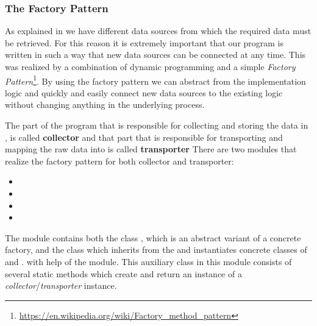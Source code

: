 \subsubsection{The Factory Pattern}
\label{subsubsec:factory}
As explained in  we have different data sources from which the required data must be retrieved.
For this reason it is extremely important that our program is written in such a way that new data sources can be connected at any time.
This was realized by a combination of dynamic programming and a simple \textit{Factory Pattern}\footnote{\url{https://en.wikipedia.org/wiki/Factory_method_pattern}}.
By using the factory pattern we can abstract from the implementation logic and quickly and easily connect new data sources to the existing logic without changing anything in the underlying process.

The part of the program that is responsible for collecting and storing the data in \gds{}, is called \textbf{collector}
and that part that is responsible for transporting and mapping the raw data into \pg{} is called \textbf{transporter}
There are two modules that realize the factory pattern for both collector and transporter:

\begin{itemize}
  \item {}
  \item {}
  \item {}
  \item {}
\end{itemize}

The module  contains both the class , which is an abstract variant of a concrete factory, and the class
 which inherits from the  and instantiates concrete classes of  and .
with help of the  module.
This auxiliary class in this module consists of several static methods which create and return an instance of a \textit{collector}/\textit{transporter} instance.
